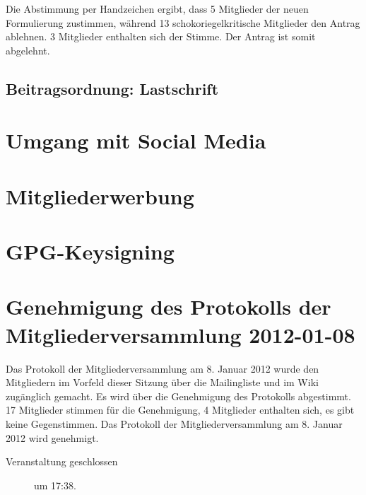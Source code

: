\documentclass[a4paper,12pt]{scrartcl}
\begin{document}
Die Abstimmung per Handzeichen ergibt, dass 5 Mitglieder der neuen Formulierung
zustimmen, während 13 schokoriegelkritische Mitglieder den Antrag ablehnen. 3
Mitglieder enthalten sich der Stimme. Der Antrag ist somit abgelehnt.

\subsection{Beitragsordnung: Lastschrift}




\section{Umgang mit Social Media}



\section{Mitgliederwerbung}




\section{GPG-Keysigning}

\section{Genehmigung des Protokolls der Mitgliederversammlung 2012-01-08}
Das Protokoll der Mitgliederversammlung am 8. Januar 2012 wurde den Mitgliedern
im Vorfeld dieser Sitzung über die Mailingliste und im Wiki zugänglich gemacht.
Es wird über die Genehmigung des Protokolls abgestimmt. 17 Mitglieder stimmen
für die Genehmigung, 4 Mitglieder enthalten sich, es gibt keine Gegenstimmen.
Das Protokoll der Mitgliederversammlung am 8. Januar 2012 wird genehmigt.

\begin{description}
  \item[Veranstaltung geschlossen] um 17:38.
\end{description}


\appendix
\end{document}
